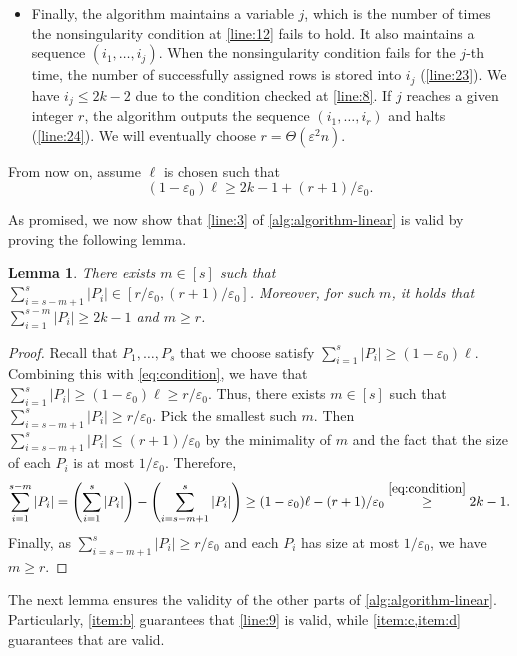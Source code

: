 \documentclass[11pt]{article}
\theoremstyle{plain}
\newtheorem{lemma}[thm]{Lemma}
\theoremstyle{definition}
\theoremstyle{remark}
\newcommand{\eps}{\varepsilon}
\begin{document}
\begin{itemize}
\item Finally, the algorithm maintains a variable $j$, which is the number of times the nonsingularity condition at \cref{line:12} fails to hold.
It also maintains a sequence $(i_1,\dots,i_j)$. 
When the nonsingularity condition fails for the $j$-th time, the number of successfully assigned rows is stored into $i_j$ (\cref{line:23}). We have $i_j\leq 2k-2$ due to the condition checked at \cref{line:8}.
If $j$ reaches a given integer $r$, the algorithm outputs the sequence $(i_1,\dots,i_r)$ and halts (\cref{line:24}).
We will eventually choose $r=\Theta(\eps^2 n)$.
\end{itemize}
From now on, assume $\ell$ is chosen such that
\begin{equation}\label{eq:condition}
(1-\eps_0)\ell\geq 2k-1+(r+1)/\eps_0. 
\end{equation}


As promised, we now show that \cref{line:3} of \cref{alg:algorithm-linear} is valid by proving the following lemma.
\begin{lemma}\label{lem:sum-of-Pi}
There exists $m\in [s]$ such that $\sum_{i=s-m+1}^s |P_i|\in [r/\eps_0, (r+1)/\eps_0]$. Moreover, for such $m$, it holds that $\sum_{i=1}^{s-m}|P_i|\geq 2k-1$ and $m\geq r$. 
\end{lemma}
\begin{proof}
Recall that $P_1,\dots,P_s$ that we choose satisfy
$\sum_{i=1}^s |P_i|\geq (1-\eps_0)\ell$.
Combining this with \eqref{eq:condition}, we have that $\sum_{i=1}^s |P_i|\geq (1-\eps_0)\ell\geq r/\eps_0$. Thus, there
exists $m\in [s]$ such that $\sum_{i=s-m+1}^s |P_i|\geq r/\eps_0$.
Pick the smallest such $m$. Then $\sum_{i=s-m+1}^s |P_i|\leq (r+1)/\eps_0$ by the minimality of $m$ and the fact that the size of each $P_i$ is at most $1/\eps_0$.
Therefore,
\[
\sum_{i=1}^{s-m}|P_i|=\left(\sum_{i=1}^{s}|P_i|\right)-\left(\sum_{i=s-m+1}^{s}|P_i|\right)\geq (1-\eps_0)\ell - (r+1)/\eps_0 \stackrel{\eqref{eq:condition}}{\geq} 2k-1. 
\]
Finally, as $\sum_{i=s-m+1}^s |P_i|\geq r/\eps_0$ and each $P_i$ has size at most $1/\eps_0$, we have $m\geq r$. 
\end{proof}

The next lemma ensures the validity of the other parts of \cref{alg:algorithm-linear}. Particularly, \cref{item:b} guarantees that \cref{line:9} is valid, while \cref{item:c,item:d} guarantees that  are valid.
\end{document}
